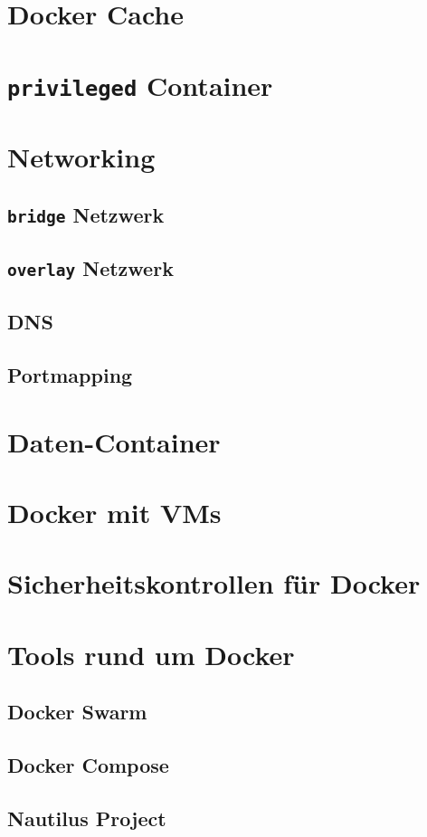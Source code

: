 \documentclass[11pt,a4paper,oneside]{report}
\begin{document}
	\section{Docker Cache}
	\section{\texttt{privileged} Container}
	\section{Networking}
		\subsection{\texttt{bridge} Netzwerk}
		\subsection{\texttt{overlay} Netzwerk}
		\subsection{DNS}
		\subsection{Portmapping}
	\section{Daten-Container}
	\section{Docker mit VMs}
  \section{Sicherheitskontrollen für Docker}
	\section{Tools rund um Docker}
		\subsection{Docker Swarm}
		\subsection{Docker Compose}
		\subsection{Nautilus Project}
\end{document}
